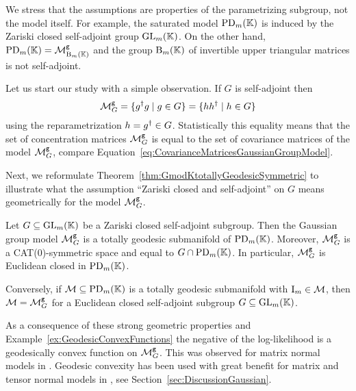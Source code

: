 We stress that the assumptions are properties of the parametrizing subgroup, not the model itself.
For example, the saturated model $\operatorname{PD}_m(\mathbb K)$ is induced by the Zariski closed self-adjoint group $\operatorname{GL}_m(\mathbb K)$. On the other hand, $\operatorname{PD}_m(\mathbb K) = \mathcal{M}^{\mathtt{g}}_{\operatorname{B}_m(\mathbb K)}$ and the group $\operatorname{B}_m(\mathbb K)$ of invertible upper triangular matrices is not self-adjoint.

Let us start our study with a simple observation. If $G$ is self-adjoint then
	\[ \mathcal{M}^{\mathtt{g}}_G = \{g^{\dagger} g \mid g \in G\} = \{ h h^{\dagger} \mid h \in G\} \]
using the reparametrization $h = g^{\dagger} \in G$.
Statistically this equality means that the set of concentration matrices $\mathcal{M}^{\mathtt{g}}_G$ is equal to the set of covariance matrices of the model $\mathcal{M}^{\mathtt{g}}_G$, compare Equation~\eqref{eq:CovarianceMatricesGaussianGroupModel}.


Next, we reformulate Theorem~\ref{thm:GmodKtotallyGeodesicSymmetric} to illustrate what the assumption ``Zariski closed and self-adjoint'' on $G$ means geometrically for the model $\mathcal{M}^{\mathtt{g}}_G$.

\begin{theorem}\label{thm:MGtotallyGeodsicSymmetric}
	Let $G \subseteq \operatorname{GL}_m(\mathbb K)$ be a Zariski closed self-adjoint subgroup. Then the Gaussian group model $\mathcal{M}^{\mathtt{g}}_G$ is a totally geodesic submanifold of $\operatorname{PD}_m(\mathbb K)$. Moreover, $\mathcal{M}^{\mathtt{g}}_G$ is a CAT(0)-symmetric space and equal to $G \cap \operatorname{PD}_m(\mathbb K)$. In particular, $\mathcal{M}^{\mathtt{g}}_G$ is Euclidean closed in $\operatorname{PD}_m(\mathbb K)$.
	
	Conversely, if $\mathcal{M} \subseteq \operatorname{PD}_m(\mathbb K)$ is a totally geodesic submanifold with $\operatorname{I}_m \in \mathcal{M}$, then $\mathcal{M} = \mathcal{M}^{\mathtt{g}}_G$ for a Euclidean closed self-adjoint subgroup $G \subseteq \operatorname{GL}_m(\mathbb K)$.
\end{theorem}

As a consequence of these strong geometric properties and Example~\ref{ex:GeodesicConvexFunctions} the negative of the log-likelihood is a geodesically convex function on $\mathcal{M}^{\mathtt{g}}_G$. This was observed for matrix normal models in \cite{WieselGeodesic}. Geodesic convexity has been used with great benefit for matrix and tensor normal models in \cite{OptimalSampleComplexity}, see Section~\ref{sec:DiscussionGaussian}.

